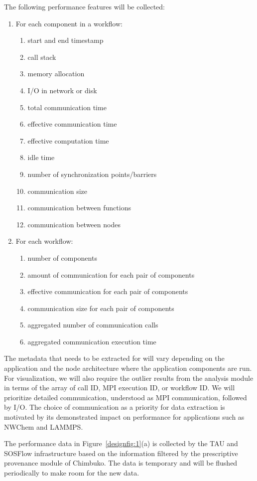 The following performance features will be collected:
\begin{enumerate}
\item For each component in a workflow:
\begin{enumerate}
\item start and end timestamp
\item call stack
\item memory allocation
\item I/O in network or disk
\item total communication time
\item effective communication time
\item effective computation time
\item idle time
\item number of synchronization points/barriers
\item communication size
\item communication between functions
\item communication between nodes
\end{enumerate}
\item For each workflow:
\begin{enumerate}
\item number of components
\item amount of communication for each pair of components
\item effective communication for each pair of components
\item communication size for each pair of components
\item aggregated number of communication calls 
\item aggregated communication execution time
\end{enumerate}
\end{enumerate}
The metadata that needs to be extracted for will vary depending on the application and the node architecture where the application components are run.
For visualization, we will also require the outlier results from the analysis module in terms of the array of call ID, MPI execution ID, or workflow ID.  
We will prioritize detailed communication, understood as MPI communication, followed by I/O.  The choice of communication as a priority for data extraction is motivated by its demonstrated impact on performance for applications such as NWChem and LAMMPS. 

The performance data in Figure~\ref{designfig:1}(a) is collected by the TAU and SOSFlow infrastructure based on the information filtered by the prescriptive provenance module of Chimbuko. The data is temporary and will be flushed periodically to make room for the new data.

